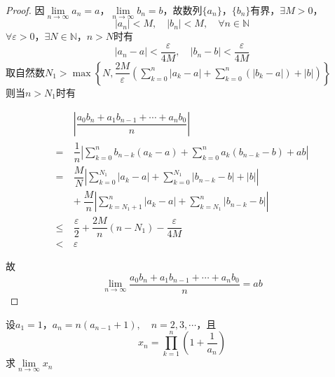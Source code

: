 \begin{proof}

    因$\lim\limits_{n \to \infty}{a_n} = a$，$\lim\limits_{n \to \infty}{b_n} = b $，故数列$\{a_n\}$，$\{b_n\}$有界，$\exists M > 0$，
    $$|a_n| < M, \quad |b_n| < M, \quad \forall n \in \mathbb{N}$$
    $\forall \varepsilon > 0 $，$\exists N \in \mathbb{N}$，$n > N$时有
    $$|a_n - a| < \dfrac{\varepsilon}{4M}, \quad |b_n - b| < \dfrac{\varepsilon}{4M}$$
    取自然数$N_1 > \max\left\{ N, \dfrac{2M}{\varepsilon}\left( \sum\limits_{k = 0}^{n}{|a_k - a|} + \sum\limits_{k = 0}^{n}{(|b_k - a|)} + |b| \right) \right\}$ \\
    则当$n > N_1$时有

    \begin{align*}
        & \left| \dfrac{a_0b_n + a_1b_{n - 1} + \cdots + a_nb_0}{n} \right| \\
        = \ & \dfrac{1}{n} \left| \sum\limits_{k = 0}^{n}{b_{n - k}(a_k - a)} + \sum\limits_{k = 0}^{n}{a_k(b_{n - k} - b)} + ab \right| \\
        = \ & \dfrac{M}{N} \left| \sum\limits_{k = 0}^{N_1}{|a_k - a|} + \sum\limits_{k = 0}^{N_1}{|b_{n - k} - b|} + |b| \right| \\
        \ & + \ \dfrac{M}{n} \left| \sum\limits_{k = N_1 + 1}^{n}{|a_k - a|} + \sum\limits_{k = N_1}^{n}{|b_{n - k} - b|} \right| \\
        \leq \ & \dfrac{\varepsilon}{2} + \dfrac{2M}{n}(n - N_1) - \dfrac{\varepsilon}{4M} \\
        < \ & \varepsilon 
    \end{align*}

    故
    $$\lim\limits_{n \to \infty}{\dfrac{a_0b_n + a_1b_{n - 1} + \cdots + a_nb_0}{n}} = ab$$
    
\end{proof}

\begin{proposition}

    设$a_1 = 1$，$a_n = n(a_{n - 1} + 1), \quad n = 2, 3, \cdots $，且
    $$x_n = \prod_{k  = 1}^{n}{\left( 1 + \dfrac{1}{a_n} \right)}$$
    求$\lim\limits_{n \to \infty}{x_n}$

\end{proposition}

